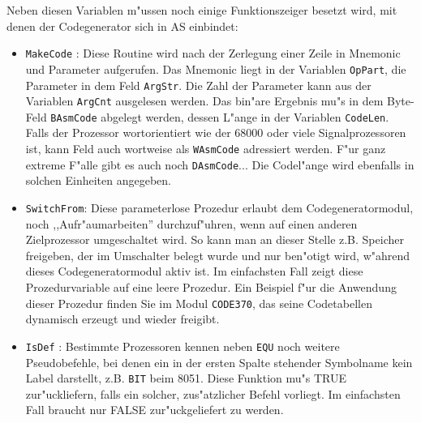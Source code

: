 \documentclass[12pt,a4paper,twoside]{report}
\newcommand{\tty}[1]{{\tt #1}}
\begin{document}
Neben diesen Variablen m"ussen noch einige Funktionszeiger besetzt wird,
mit denen der Codegenerator sich in AS einbindet:
\begin{itemize}
\item{\tty{MakeCode} : Diese Routine wird nach der Zerlegung einer Zeile
      in Mnemonic und Parameter aufgerufen.  Das Mnemonic liegt in der
      Variablen \tty{OpPart}, die Parameter in dem Feld \tty{ArgStr}.
      Die Zahl der Parameter kann aus der Variablen \tty{ArgCnt} ausgelesen
      werden.  Das bin"are Ergebnis mu"s in dem Byte-Feld \tty{BAsmCode}
      abgelegt werden, dessen L"ange in der Variablen \tty{CodeLen}.  Falls
      der Prozessor wortorientiert wie der 68000 oder viele Signalprozessoren
      ist, kann Feld auch wortweise als \tty{WAsmCode} adressiert werden.
      F"ur ganz extreme F"alle gibt es auch noch \tty{DAsmCode}... Die
      Codel"ange wird ebenfalls in solchen Einheiten angegeben.}
\item{\tty{SwitchFrom}: Diese parameterlose Prozedur erlaubt dem
      Codegeneratormodul, noch ,,Aufr"aumarbeiten'' durchzuf"uhren,
      wenn auf einen anderen Zielprozessor umgeschaltet wird.  So
      kann man an dieser Stelle z.B. Speicher freigeben, der im
      Umschalter belegt wurde und nur ben"otigt wird, w"ahrend dieses
      Codegeneratormodul aktiv ist.  Im einfachsten Fall zeigt diese
      Prozedurvariable auf eine leere Prozedur.  Ein Beispiel f"ur die
      Anwendung dieser Prozedur finden Sie im Modul \tty{CODE370}, das
      seine Codetabellen dynamisch erzeugt und wieder freigibt.}
\item{\tty{IsDef} : Bestimmte Prozessoren kennen neben \tty{EQU} noch weitere
      Pseudobefehle, bei denen ein in der ersten Spalte stehender
      Symbolname kein Label darstellt, z.B. \tty{BIT} beim 8051.  Diese
      Funktion mu"s TRUE zur"uckliefern, falls ein solcher, zus"atzlicher
      Befehl vorliegt.  Im einfachsten Fall braucht nur FALSE
      zur"uckgeliefert zu werden.}
\end{itemize}
\end{document}
